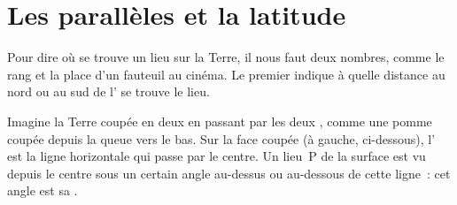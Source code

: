 \section{Les parallèles et la latitude}

Pour dire où se trouve un lieu sur la Terre, il nous faut deux nombres,
comme le rang et la place d'un fauteuil au cinéma. Le premier indique à
quelle distance au nord ou au sud de l' se trouve le lieu.

Imagine la Terre coupée en deux en passant par les deux , comme une
pomme coupée depuis la queue vers le bas. Sur la face coupée (à gauche,
ci-dessous), l' est la ligne horizontale qui passe par le centre.
Un lieu~P de la surface est vu depuis le centre sous un certain angle
au-dessus ou au-dessous de cette ligne~: cet angle est sa .

